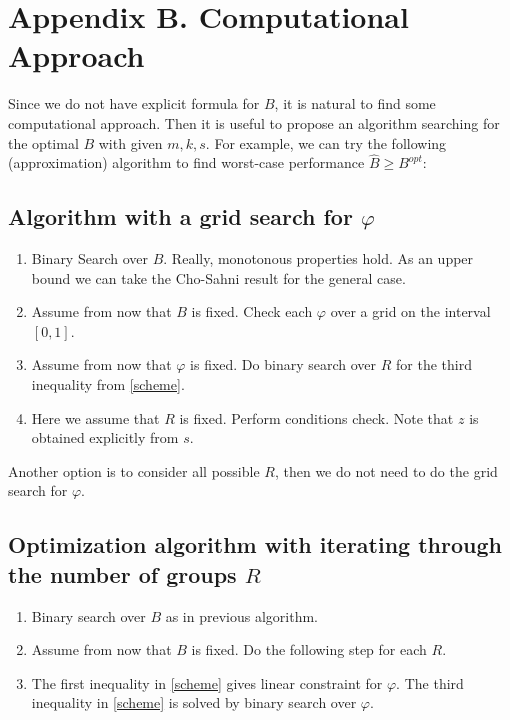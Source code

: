 \documentclass[a4paper, preprint, authoryear]{elsarticle}
\begin{document}
\section*{Appendix B. Computational Approach}

Since we do not have explicit formula for $B$, it is natural to find some computational approach. 
Then it is useful to propose an algorithm searching for the optimal $B$ 
with given $m, k, s$.
For example, we can try the following (approximation) algorithm to find worst-case performance $\hat{B} \geq B^{opt}$:

\subsection*{Algorithm with a grid search for $\varphi$}

\begin{enumerate}[itemsep = -1mm, leftmargin = *]

    \item Binary Search over $B$. Really, monotonous properties hold. As an upper bound we can take the Cho-Sahni result for the general case.

    \item Assume from now that $B$ is fixed. Check each $\varphi$ over a grid on the interval $[0, 1]$.

    \item Assume from now that $\varphi$ is fixed. Do binary search over $R$ for the third inequality from \eqref{scheme}.

    \item Here we assume that $R$ is fixed. Perform conditions check. Note that $z$ is obtained explicitly from $s$.

\end{enumerate}

Another option is to consider all possible $R$, then we do not need to do the 
grid search for $\varphi$. 

\subsection*{Optimization algorithm with iterating through the number of groups $R$}

\begin{enumerate}[itemsep = -1mm, leftmargin = *]
    \item Binary search over $B$ as in previous algorithm.

    \item Assume from now that $B$ is fixed. Do the following step for each $R$.

    \item The first inequality in \eqref{scheme} gives linear constraint 
        for $\varphi$. The third inequality in \eqref{scheme} is solved 
        by binary search over $\varphi$.

\end{enumerate}
\end{document}
